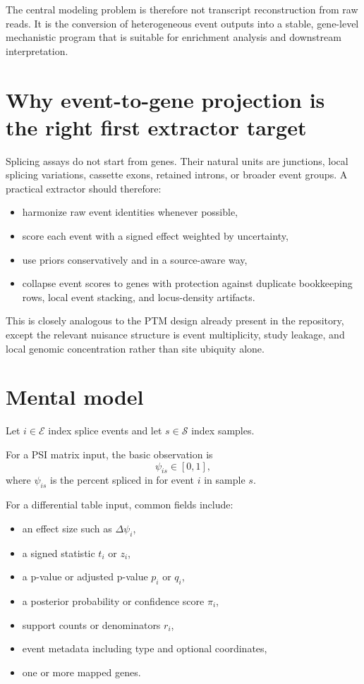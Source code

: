 \documentclass[11pt]{article}
\begin{document}
The central modeling problem is therefore not transcript reconstruction from raw reads. It is the conversion of heterogeneous event outputs into a stable, gene-level mechanistic program that is suitable for enrichment analysis and downstream interpretation.

\section{Why event-to-gene projection is the right first extractor target}
Splicing assays do not start from genes. Their natural units are junctions, local splicing variations, cassette exons, retained introns, or broader event groups. A practical extractor should therefore:
\begin{itemize}[leftmargin=2em]
\item harmonize raw event identities whenever possible,
\item score each event with a signed effect weighted by uncertainty,
\item use priors conservatively and in a source-aware way,
\item collapse event scores to genes with protection against duplicate bookkeeping rows, local event stacking, and locus-density artifacts.
\end{itemize}

This is closely analogous to the PTM design already present in the repository, except the relevant nuisance structure is event multiplicity, study leakage, and local genomic concentration rather than site ubiquity alone.

\section{Mental model}
Let $i \in \mathcal{E}$ index splice events and let $s \in \mathcal{S}$ index samples.

For a PSI matrix input, the basic observation is
\[
\psi_{is} \in [0,1],
\]
where $\psi_{is}$ is the percent spliced in for event $i$ in sample $s$.

For a differential table input, common fields include:
\begin{itemize}[leftmargin=2em]
\item an effect size such as $\Delta \psi_i$,
\item a signed statistic $t_i$ or $z_i$,
\item a p-value or adjusted p-value $p_i$ or $q_i$,
\item a posterior probability or confidence score $\pi_i$,
\item support counts or denominators $r_i$,
\item event metadata including type and optional coordinates,
\item one or more mapped genes.
\end{itemize}
\end{document}
